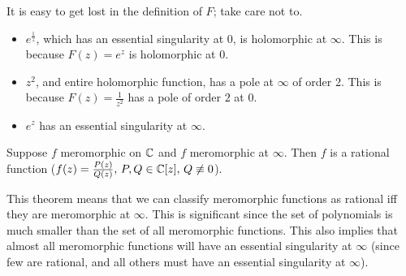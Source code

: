 \begin{example}
It is easy to get lost in the definition of $F$; take care not to.
\begin{itemize}
    \item $e^{\frac{1}{z}}$, which has an essential singularity at $0$, is holomorphic at $\infty$. This is because $F(z) = e^z$ is holomorphic at $0$.
    
    \item $z^2$, and entire holomorphic function, has a pole at $\infty$ of order 2. This is because $F(z) = \frac{1}{z^2}$ has a pole of order $2$ at $0$.
    
    \item $e^z$ has an essential singularity at $\infty$.
\end{itemize}
\end{example}


\begin{theorem}\label{thm:char-rat}

Suppose $f $ meromorphic on $\mathbb{C}$ and $f $ meromorphic at $\infty$. 
Then $f$ is a rational function ($f(z) = \frac{P(z)}{Q(z)}, \, P,Q \in \mathbb{C} [z], \, Q \not\equiv 0$).
\end{theorem}

\begin{note}
This theorem means that we can classify meromorphic functions as rational iff they are meromorphic at $\infty$. This is significant since the set of polynomials is much smaller than the set of all meromorphic functions. This also implies that almost all meromorphic functions will have an essential singularity at $\infty$ (since few are rational, and all others must have an essential singularity at $\infty$).
\end{note}

